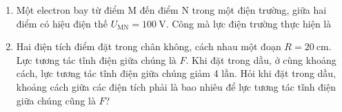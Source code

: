 \begin{enumerate}[label=\bfseries Câu \arabic*:]
\item Một electron bay từ điểm M đến điểm N trong một điện trường, giữa hai điểm có hiệu điện thế $U_\text{MN}=\SI{100}{\volt}$. Công mà lực điện trường thực hiện là

\item Hai điện tích điểm đặt trong chân không, cách nhau một đoạn $R=\SI{20}{\centi\meter}$. Lực tương tác tĩnh điện giữa chúng là $F$. Khi đặt trong dầu, ở cùng khoảng cách, lực tương tác tĩnh điện giữa chúng giảm 4 lần. Hỏi khi đặt trong dầu, khoảng cách giữa các điện tích phải là bao nhiêu để lực tương tác tĩnh điện giữa chúng cũng là $F$?



\end{enumerate}
